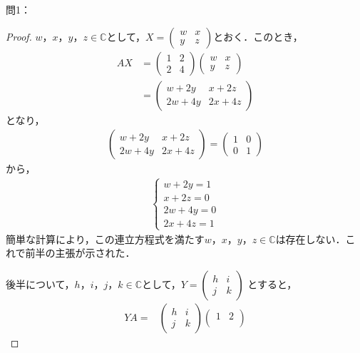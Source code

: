 \documentclass[dvipdfmx,uplatex,11pt]{jsarticle}
\theoremstyle{definition}
\begin{document}
問1：\\
\noindent
\begin{leftbar}
\begin{proof}
$w，x，y，z \in \mathbb{C}$として，$X=
\begin{pmatrix}
w & x \\
y & z
\end{pmatrix}
$とおく．このとき，
\begin{align}
AX & =
\begin{pmatrix}
1 & 2 \\
2 & 4
\end{pmatrix}
\begin{pmatrix}
w & x \\
y & z
\end{pmatrix}
\\
& = 
\begin{pmatrix}
w + 2y & x + 2z \\
2w + 4y & 2x + 4z
\end{pmatrix}
\end{align}
となり，
\begin{gather*}
\begin{pmatrix}
w + 2y & x +2z \\
2w + 4y & 2x + 4z
\end{pmatrix}
=
\begin{pmatrix}
1 & 0 \\
0 & 1 
\end{pmatrix}
\end{gather*}
から，
\begin{gather*}
\begin{cases}
w+2y = 1 \\
x+2z = 0 \\
2w+4y =0 \\
2x+4z=1
\end{cases}
\end{gather*}
簡単な計算により，この連立方程式を満たす$w，x，y，z \in \mathbb{C}$は存在しない．これで前半の主張が示された．\par
後半について，$h，i，j，k \in \mathbb{C}$として，$Y=
\begin{pmatrix}
h & i \\
j & k
\end{pmatrix}
$
とすると，
\begin{align}
YA=&
\begin{pmatrix}
h & i \\
j & k
\end{pmatrix}
\begin{pmatrix}
1 & 2 \\

\end{pmatrix}
\end{align}
\end{proof}
\end{leftbar}
\end{document}
